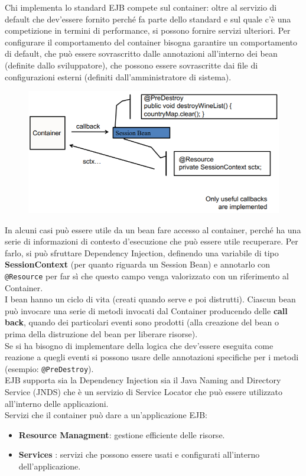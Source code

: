 Chi implementa lo standard EJB compete sul container: oltre al servizio di default che dev’essere fornito perché fa parte dello standard e sul quale c’è una competizione in termini di performance, si possono fornire servizi ulteriori.
Per configurare il comportamento del container bisogna garantire un comportamento di default, che può essere sovrascritto dalle annotazioni all’interno dei bean (definite dallo sviluppatore), che possono essere sovrascritte dai file di configurazioni esterni (definiti dall’amministratore di sistema).

\begin{figure}[H]
    \centering
    \includegraphics[scale=0.8]{Imm/session-bean.png}
\end{figure}

In alcuni casi può essere utile da un bean fare accesso al container, perché ha una serie di informazioni di contesto d’esecuzione che può essere utile recuperare.
Per farlo, si può sfruttare Dependency Injection, definendo una variabile di tipo \textbf{SessionContext} (per quanto riguarda un Session Bean) e annotarlo con  \texttt{@Resource} per far sì che questo campo venga valorizzato con un riferimento al Container.\\

I bean hanno un ciclo di vita (creati quando serve e poi distrutti). Ciascun bean può invocare una serie di metodi invocati dal Container producendo delle \textbf{call back}, quando dei particolari eventi sono prodotti (alla creazione del bean o prima della distruzione del bean per liberare risorse).\\
Se si ha bisogno di implementare della logica che dev’essere eseguita come reazione a quegli eventi si possono usare delle annotazioni specifiche per i metodi (esempio:  \texttt{@PreDestroy}).\\

EJB supporta sia la Dependency Injection sia il Java Naming and Directory Service (JNDS) che è un servizio di Service Locator che può essere utilizzato all’interno delle applicazioni.\\
Servizi che il container può dare a un’applicazione EJB:
\begin{itemize}
    \item \textbf{Resource Managment}: gestione efficiente delle risorse.
    \item \textbf{Services} : servizi che possono essere usati e configurati all’interno dell’applicazione.
\end{itemize}

